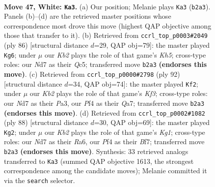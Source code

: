 \documentclass[11pt]{article}
\begin{document}
\clearpage

\begin{figure}[p]\centering
\begin{subfigure}{0.46\textwidth}\centering
\resizebox{\linewidth}{!}{%
\newchessgame
\chessboard[
  setfen={7k/3N4/8/8/2p2P2/1pP5/1K1q4/8 w - - 2 47},
  showmover=false,
  pgfstyle=straightmove, color=movearrow, markmove={b2-a3}
]}
\caption{}
\end{subfigure}\hfill
\begin{subfigure}{0.46\textwidth}\centering
\resizebox{\linewidth}{!}{%
\newchessgame
\chessboard[
  setfen={k7/8/p6p/2Q4K/8/6Pq/P7/8 w - - 1 44},
  showmover=false,
  pgfstyle=straightmove, color=movearrow, markmove={h5-g6}
]}
\caption{}
\end{subfigure}
\\[4pt]
\begin{subfigure}{0.46\textwidth}\centering
\resizebox{\linewidth}{!}{%
\newchessgame
\chessboard[
  setfen={8/Q7/p7/8/2P5/P4K1q/6p1/k7 w - - 0 47},
  showmover=false,
  pgfstyle=straightmove, color=movearrow, markmove={f3-f2}
]}
\caption{}
\end{subfigure}\hfill
\begin{subfigure}{0.46\textwidth}\centering
\resizebox{\linewidth}{!}{%
\newchessgame
\chessboard[
  setfen={8/5B2/R5p1/2k5/8/6P1/5P2/4q1K1 w - - 1 45},
  showmover=false,
  pgfstyle=straightmove, color=movearrow, markmove={g1-g2}
]}
\caption{}
\end{subfigure}
\caption{\textbf{Move 47, White: \texttt{Ka3}.} (a) Our position; Melanie plays \texttt{Ka3} (\texttt{b2a3}). Panels (b)--(d) are the retrieved master positions whose correspondence most drove this move (highest QAP objective among those that transfer to it). (b) Retrieved from \texttt{ccrl\_top\_p0003\#2049} (ply 86) [structural distance $d$=29, QAP obj=79]: the master played \texttt{Kg6}; under $\mu$ our \emph{Kb2} plays the role of that game's \emph{Kh5}; cross-type roles: our \emph{N}d7 as their \emph{Q}c5; transferred move \texttt{b2a3} \textbf{(endorses this move)}. (c) Retrieved from \texttt{ccrl\_top\_p0000\#2798} (ply 92) [structural distance $d$=34, QAP obj=74]: the master played \texttt{Kf2}; under $\mu$ our \emph{Kb2} plays the role of that game's \emph{Kf3}; cross-type roles: our \emph{N}d7 as their \emph{P}a3, our \emph{P}f4 as their \emph{Q}a7; transferred move \texttt{b2a3} \textbf{(endorses this move)}. (d) Retrieved from \texttt{ccrl\_top\_p0002\#1082} (ply 88) [structural distance $d$=30, QAP obj=69]: the master played \texttt{Kg2}; under $\mu$ our \emph{Kb2} plays the role of that game's \emph{Kg1}; cross-type roles: our \emph{N}d7 as their \emph{R}a6, our \emph{P}f4 as their \emph{B}f7; transferred move \texttt{b2a3} \textbf{(endorses this move)}. Synthesis: 33 retrieved analogs transferred to \texttt{Ka3} (summed QAP objective 1613, the strongest correspondence among the candidate moves); Melanie committed it via the \texttt{search} selector.}
\label{fig:thought-m92}
\end{figure}
\end{document}
